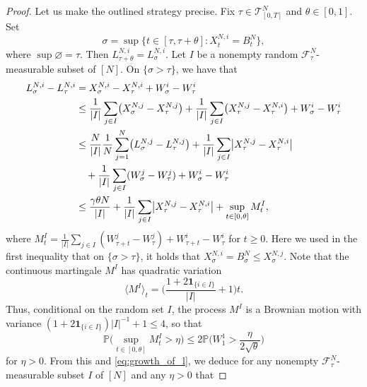 \documentclass[11pt, a4paper]{article}
\theoremstyle{plain}
\theoremstyle{definition}
\theoremstyle{remark}
\numberwithin{equation}{section}
\newcommand{\pr}{\mathbb{P}}
\newcommand{\F}{\mathcal{F}}
\newcommand{\define}{\mathpunct{:}}
\renewcommand{\bf}[1]{\mathbf{#1}}
\renewcommand{\cal}[1]{\mathcal{#1}}
\begin{document}
\begin{proof}
Let us make the outlined strategy precise. Fix $\tau \in \cal{T}^N_{[0, T]}$ and $\theta \in [0, 1]$. Set
\begin{equation*}
    \sigma = \sup\bigl\{t \in [\tau, \tau + \theta] \define X^{N, i}_t = B^N_t\bigr\},
\end{equation*}
where $\sup \varnothing = \tau$. Then $L^{N, i}_{\tau + \theta} = L^{N, i}_{\sigma}$. Let $I$ be a nonempty random $\F^N_{\tau}$-measurable subset of $[N]$. On $\{\sigma > \tau\}$, we have that
\begin{align} \label{eq:growth_of_l}
    L^{N, i}_{\sigma} - L^{N, i}_{\tau} &= X^{N, i}_{\sigma} - X^{N, i}_{\tau} + W^i_{\sigma} - W^i_{\tau} \notag \\
    &\leq \frac{1}{\lvert I \rvert}\sum_{j \in I} \bigl(X^{N, j}_{\sigma} - X^{N, j}_{\tau}\bigr) + \frac{1}{\lvert I \rvert}\sum_{j \in I} \bigl(X^{N, j}_{\tau} - X^{N, i}_{\tau}\bigr) + W^i_{\sigma} - W^i_{\tau} \notag \\
    &\leq \frac{N}{\lvert I \rvert} \frac{1}{N} \sum_{j = 1}^N \bigl(L^{N, j}_{\sigma} - L^{N, j}_{\tau}\bigr) + \frac{1}{\lvert I \rvert}\sum_{j \in I} \bigl\lvert X^{N, j}_{\tau} - X^{N, i}_{\tau}\bigr\rvert \notag \\
    &\ \ \ + \frac{1}{\lvert I \rvert}\sum_{j \in I} (W^j_{\sigma} - W^j_{\tau}) + W^i_{\sigma} - W^i_{\tau} \notag \\
    &\leq \frac{\gamma \theta N}{\lvert I\rvert} + \frac{1}{\lvert I \rvert}\sum_{j \in I} \bigl\lvert X^{N, j}_{\tau} - X^{N, i}_{\tau}\bigr\rvert + \sup_{t \in [0, \theta]} M^I_t,
\end{align}
where $M^I_t = \frac{1}{\lvert I \rvert}\sum_{j \in I} (W^j_{\tau + t} - W^j_{\tau}) + W^i_{\tau + t} - W^i_{\tau}$ for $t \geq 0$. Here we used in the first inequality that on $\{\sigma > \tau\}$, it holds that $X^{N, i}_{\sigma} = B^N_{\sigma} \leq X^{N, j}_{\sigma}$. Note that the continuous martingale $M^I$ has quadratic variation
\begin{equation*}
    \langle M^I \rangle_t = \biggl(\frac{1 + 2\bf{1}_{\{i \in I\}}}{\lvert I\rvert} + 1\biggr) t.
\end{equation*}
Thus, conditional on the random set $I$, the process $M^I$ is a Brownian motion with variance $(1 + 2\bf{1}_{\{i \in I\}})\lvert I\rvert^{-1} + 1 \leq 4$, so that
\begin{equation*}
    \pr\biggl(\sup_{t \in [0, \theta]} M^I_t > \eta\biggr) \leq 2 \pr\biggl(W^1_1 > \frac{\eta}{2 \sqrt{\theta}}\biggr)
\end{equation*}
for $\eta > 0$. From this and \eqref{eq:growth_of_l}, we deduce for any nonempty $\F^N_{\tau}$-measurable subset $I$ of $[N]$ and any $\eta > 0$ that

\end{proof}
\end{document}
